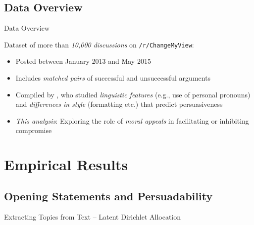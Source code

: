 \documentclass{beamer}
\begin{document}
\subsection{Data Overview}
\begin{frame}{Data Overview}

Dataset of more than \emph{10,000 discussions} on \texttt{/r/ChangeMyView}: 
\begin{itemize}
	\item Posted between January 2013 and May 2015
	\item Includes \emph{matched pairs} of successful and unsuccessful arguments
	\item Compiled by \citet{tan2016winning}, who studied \emph{linguistic features} (e.g., use of personal pronouns) and \emph{differences in style} (formatting etc.) that predict persuasiveness
	\vspace{1em}
	\item \emph{This analysis}: Exploring the role of \emph{moral appeals} in facilitating or inhibiting compromise
\end{itemize}
\end{frame}


\section{Empirical Results}

\subsection{Opening Statements and Persuadability}
\begin{frame}{Extracting Topics from Text -- Latent Dirichlet Allocation}
\begin{figure}
\end{figure}
\end{frame}
\end{document}

